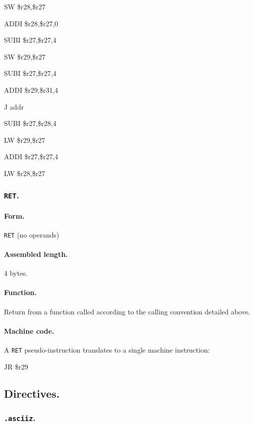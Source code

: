 \documentclass[12pt,english,twoside]{report}
\def\code{\texttt}
\newenvironment{codeblock}
{\begin{list}{}{
\setlength{\rightmargin}{\leftmargin}
\setlength{\listparindent}{0pt}%
\raggedright
\setlength{\itemsep}{0pt}
\setlength{\parsep}{0pt}
\normalfont\ttfamily}%
 \item[]}
{\end{list}}
\begin{document}
\begin{codeblock}
  SW \$r28,\$r27
  
  ADDI \$r28,\$r27,0
  
  SUBI \$r27,\$r27,4
  
  SW \$r29,\$r27
  
  SUBI \$r27,\$r27,4
  
  ADDI \$r29,\$r31,4
  
  J addr
  
  SUBI \$r27,\$r28,4
  
  LW \$r29,\$r27
  
  ADDI \$r27,\$r27,4
  
  LW \$r28,\$r27
\end{codeblock}

\subsubsection*{\label{Asm_RET} \code{RET}.}
\paragraph{Form.}
\code{RET} (no operands)

\paragraph{Assembled length.} 4 bytes.

\paragraph{Function.}
Return from a function called according to the calling convention
detailed above.

\paragraph{Machine code.}
A \code{RET} pseudo-instruction translates to a single machine
instruction:

\begin{codeblock}
  JR \$r29
\end{codeblock}

\subsection{Directives.}

\subsubsection*{\label{Asm_asciiz}\code{.asciiz}.}
\end{document}
